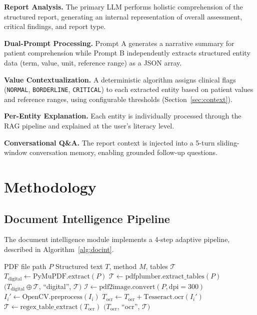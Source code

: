 \documentclass[conference]{IEEEtran}
\begin{document}
\textbf{Report Analysis.} The primary LLM performs holistic comprehension of the structured report, generating an internal representation of overall assessment, critical findings, and report type.

\textbf{Dual-Prompt Processing.} Prompt A generates a narrative summary for patient comprehension while Prompt B independently extracts structured entity data (term, value, unit, reference range) as a JSON array.

\textbf{Value Contextualization.} A deterministic algorithm assigns clinical flags (\texttt{NORMAL}, \texttt{BORDERLINE}, \texttt{CRITICAL}) to each extracted entity based on patient values and reference ranges, using configurable thresholds (Section~\ref{sec:context}).

\textbf{Per-Entity Explanation.} Each entity is individually processed through the RAG pipeline and explained at the user's literacy level.

\textbf{Conversational Q\&A.} The report context is injected into a 5-turn sliding-window conversation memory, enabling grounded follow-up questions.

\section{Methodology}

\subsection{Document Intelligence Pipeline}
\label{sec:ocr}

The document intelligence module implements a 4-step adaptive pipeline, described in Algorithm~\ref{alg:docint}.

\begin{algorithm}[htbp]
\caption{Adaptive Document Intelligence Pipeline}
\label{alg:docint}
\begin{algorithmic}[1]
\Require PDF file path $P$
\Ensure Structured text $T$, method $M$, tables $\mathcal{T}$
\State $T_{\text{digital}} \gets \text{PyMuPDF.extract}(P)$
 
    \State $\mathcal{T} \gets \text{pdfplumber.extract\_tables}(P)$
    \State \Return $(T_{\text{digital}} \oplus \mathcal{T}$, ``digital'', $\mathcal{T})$
\Else
    \State $\mathcal{I} \gets \text{pdf2image.convert}(P, \text{dpi}=300)$
        \State $I_i' \gets \text{OpenCV.preprocess}(I_i)$ 
        \State $T_{\text{ocr}} \gets T_{\text{ocr}} + \text{Tesseract.ocr}(I_i')$
    \EndFor
    \State $\mathcal{T} \gets \text{regex\_table\_extract}(T_{\text{ocr}})$
    \State \Return $(T_{\text{ocr}}$, ``ocr'', $\mathcal{T})$
\EndIf
\end{algorithmic}
\end{algorithm}
\end{document}
